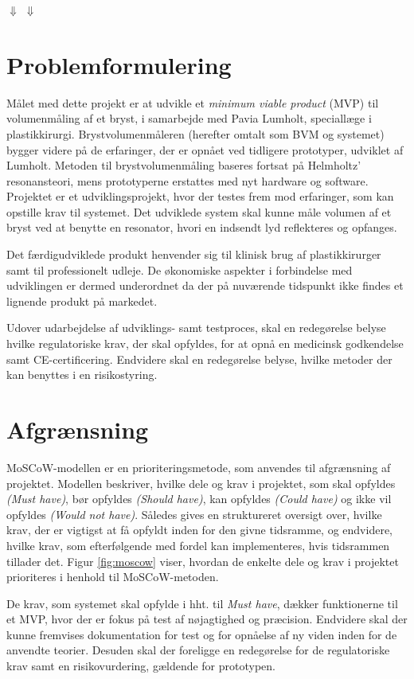 \Wudl
$\Downarrow$
\Wudled
$\Downarrow$
\W
\vspace{5mm}  

\section{Problemformulering}
Målet med dette projekt er at udvikle et \textit{minimum viable product} (MVP) til volumenmåling af et bryst, i samarbejde med Pavia Lumholt, speciallæge i plastikkirurgi. Brystvolumenmåleren (herefter omtalt som BVM og systemet) bygger videre på de erfaringer, der er opnået ved tidligere prototyper, udviklet af Lumholt. Metoden til brystvolumenmåling baseres fortsat på Helmholtz' resonansteori, mens prototyperne erstattes med nyt hardware og software. Projektet er et udviklingsprojekt, hvor der testes frem mod erfaringer, som kan opstille krav til systemet. Det udviklede system skal kunne måle volumen af et bryst ved at benytte en resonator, hvori en indsendt lyd reflekteres og opfanges. 

Det færdigudviklede produkt henvender sig til klinisk brug af plastikkirurger samt til professionelt udleje. De økonomiske aspekter i forbindelse med udviklingen er dermed underordnet da der på nuværende tidspunkt ikke findes et lignende produkt på markedet.   

Udover udarbejdelse af udviklings- samt testproces, skal en redegørelse belyse hvilke regulatoriske krav, der skal opfyldes, for at opnå en medicinsk godkendelse samt CE-certificering. Endvidere skal en redegørelse belyse, hvilke metoder der kan benyttes i en risikostyring.

\section{Afgrænsning}
MoSCoW-modellen er en prioriteringsmetode, som anvendes til afgrænsning af projektet. Modellen beskriver, hvilke dele og krav i projektet, som skal opfyldes \textit{(Must have)}, bør opfyldes \textit{(Should have)}, kan opfyldes \textit{(Could have)} og ikke vil opfyldes \textit{(Would not have)}. Således gives en struktureret oversigt over, hvilke krav, der er vigtigst at få opfyldt inden for den givne tidsramme, og endvidere, hvilke krav, som efterfølgende med fordel kan implementeres, hvis tidsrammen tillader det. Figur \ref{fig:moscow} viser, hvordan de enkelte dele og krav i projektet prioriteres i henhold til MoSCoW-metoden.

De krav, som systemet skal opfylde i hht. til \textit{Must have}, dækker funktionerne til et MVP, hvor der er fokus på test af nøjagtighed og præcision. Endvidere skal der kunne fremvises dokumentation for test og for opnåelse af ny viden inden for de anvendte teorier. Desuden skal der foreligge en redegørelse for de regulatoriske krav samt en risikovurdering, gældende for prototypen.

